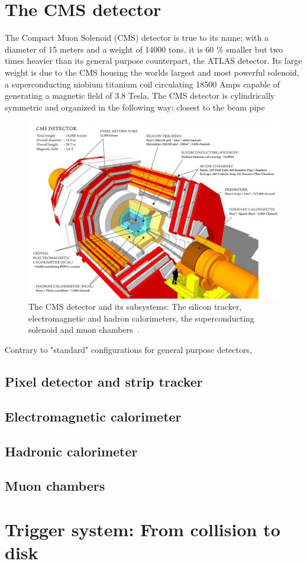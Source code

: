 \section{The CMS detector}

The Compact Muon Solenoid (CMS) detector is true to its name; with a diameter of 15 meters and a weight of 14000 tons, it is 60 \% smaller but two times heavier than its general purpose counterpart, the ATLAS detector.
Its large weight is due to the CMS housing the worlds largest and most powerful solenoid, a superconducting niobium titanium coil circulating 18500 Amps capable of generating a magnetic field of 3.8 Tesla.
The CMS detector is cylindrically symmetric and organized in the following way: closest to the beam pipe

\begin{figure}[h] 
    \centering
    \includegraphics[width=1.0\textwidth]{figures/cms/CMS.png}
    \caption{The CMS detector and its subsystems: The silicon tracker, electromagnetic and hadron calorimeters, the superconducting solenoid and muon chambers~\cite{CMS}.}
    \label{fig:cms:CMS}
\end{figure}


Contrary to "standard" configurations for general purpose detectors,
\subsection{Pixel detector and strip tracker}
\subsection{Electromagnetic calorimeter}
\subsection{Hadronic calorimeter}
\subsection{Muon chambers}
\section{Trigger system: From collision to disk}
